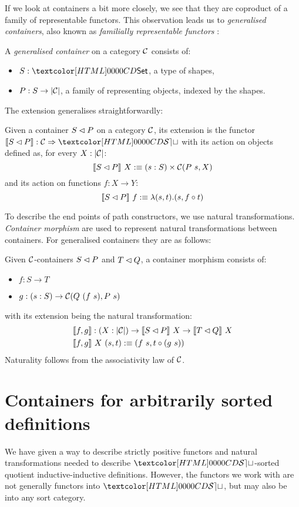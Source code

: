 If we look at containers a bit more closely, we see that they are
coproduct of a family of representable functors. This observation
leads us to \emph{generalised containers}, also known as
\emph{familially representable functors} \cite{Carboni1995}:
%
\begin{definition}
\label{def-gen-container}
  A \emph{generalised container} on a category $\mathcal{C}$ consists of:
  \begin{itemize}
  \item $S : \Set$, a type of shapes,
  \item $P : S \to | \mathcal{C} |$, a family of representing objects, indexed
    by the shapes.
  \end{itemize}
\end{definition}
%
The extension generalises straightforwardly:
%
\begin{definition}
  Given a container $S \lhd P$ on a category $\mathcal{C}$, its extension
  is the functor $\context{\cont{S}{P}} : \Func{\Cc}{\SET}$ with its
  action on objects defined as, for every $X : | \mathcal{C} |$:
  $$
  \llbracket S \lhd P \rrbracket\ X :\equiv (s : S) \times \mathcal{C}(P\ s, X)
  $$
  and its action on functions $f : X \to Y$:
  $$
  \llbracket S \lhd P \rrbracket\ f :\equiv \lambda (s , t) . (s , f \circ t)
  $$
\end{definition}
%

To describe the end points of path constructors, we use natural
transformations. \emph{Container morphism} are used to represent
natural transformations between containers. For generalised containers
they are as follows:
\begin{definition}
  Given $\mathcal{C}$-containers $S \lhd P$ and $T \lhd Q$, a container
  morphism consists of:
  \begin{itemize}
  \item $f : S \to T$
  \item $g : (s : S) \to \Cc(Q\ (f\ s), P\ s)$
  \end{itemize}
  with its extension being the natural transformation:
  \begin{align*}
    &\llbracket f , g \rrbracket : (X : | \mathcal{C} |) \to \llbracket S \lhd P \rrbracket\ X \to \llbracket T \lhd Q \rrbracket\ X \\
    &\llbracket f , g \rrbracket\ X\ (s , t) :\equiv (f\ s , t \circ (g\ s))
  \end{align*}
  Naturality follows from the associativity law of $\mathcal{C}$.
\end{definition}

\section{Containers for arbitrarily sorted definitions}
We have given a way to describe strictly positive functors and natural
transformations needed to describe $\SET$-sorted quotient
inductive-inductive definitions. However, the functors we work with
are not generally functors into $\SET$, but may also be into any sort
category.

